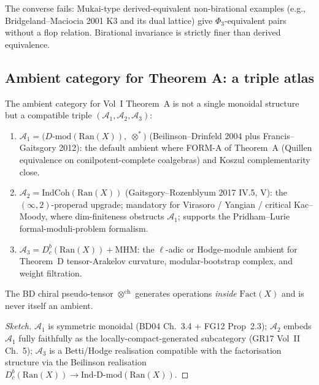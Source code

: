 \documentclass[11pt]{article}
\begin{document}
\begin{remark}
The converse fails: Mukai-type derived-equivalent non-birational
examples (e.g., Bridgeland--Maciocia 2001 K3 and its dual lattice)
give $\Phi_3$-equivalent pairs without a flop relation. Birational
invariance is strictly finer than derived equivalence.
\end{remark}

\subsection{Ambient category for Theorem A: a triple atlas}
\label{subsec:ambient-triple-atlas}

\begin{proposition}
\label{prop:ambient-triple-atlas}
The ambient category for Vol~I Theorem~A is not a single monoidal
structure but a compatible triple $(\mathcal{A}_1, \mathcal{A}_2,
\mathcal{A}_3)$:
\begin{enumerate}
\item $\mathcal{A}_1 = \bigl(D\text{-}\mathrm{mod}(\mathrm{Ran}(X)),\; \otimes^*\bigr)$
(Beilinson--Drinfeld 2004 plus Francis--Gaitsgory 2012): the default
ambient where FORM-A of Theorem~A (Quillen equivalence on
conilpotent-complete coalgebras) and Koszul complementarity close.
\item $\mathcal{A}_2 = \mathrm{IndCoh}(\mathrm{Ran}(X))$
(Gaitsgory--Rozenblyum 2017 IV.5, V): the $(\infty, 2)$-properad
upgrade; mandatory for Virasoro / Yangian / critical Kac--Moody,
where dim-finiteness obstructs $\mathcal{A}_1$; supports the
Pridham--Lurie formal-moduli-problem formalism.
\item $\mathcal{A}_3 = D^b_c(\mathrm{Ran}(X)) + \mathrm{MHM}$:
the $\ell$-adic or Hodge-module ambient for Theorem~D
tensor-Arakelov curvature, modular-bootstrap complex, and weight
filtration.
\end{enumerate}
The BD chiral pseudo-tensor $\otimes^{\mathrm{ch}}$ generates
operations \emph{inside} $\mathrm{Fact}(X)$ and is never itself an
ambient.
\end{proposition}

\begin{proof}[Sketch]
$\mathcal{A}_1$ is symmetric monoidal (BD04 Ch.~3.4 + FG12 Prop~2.3);
$\mathcal{A}_2$ embeds $\mathcal{A}_1$ fully faithfully as the
locally-compact-generated subcategory (GR17 Vol~II Ch.~5);
$\mathcal{A}_3$ is a Betti/Hodge realisation compatible with the
factorisation structure via the Beilinson realisation
$D^b_c(\mathrm{Ran}(X)) \to \mathrm{Ind}\text{-}\mathrm{D\text{-}mod}(\mathrm{Ran}(X))$.
\end{proof}
\end{document}

